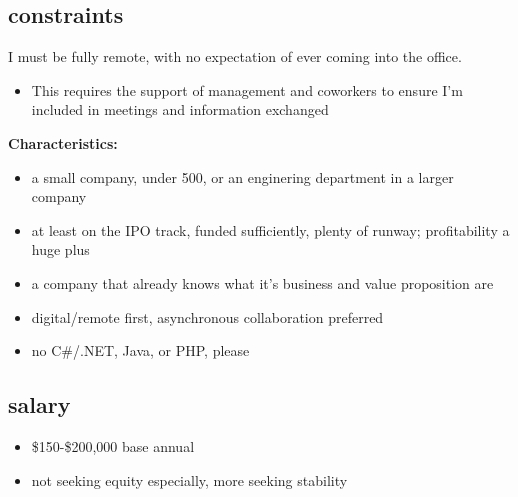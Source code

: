 \documentclass[
]{article}
\providecommand{\tightlist}{%
  \setlength{\itemsep}{0pt}\setlength{\parskip}{0pt}}
\begin{document}
\subsection{constraints}\label{constraints}

I must be fully remote, with no expectation of ever coming into the office.

\begin{itemize}
\tightlist
\item This requires the support of management and coworkers to ensure I'm included in meetings and information exchanged
\end{itemize}

\textbf{Characteristics:}

\begin{itemize}
\tightlist
\item a small company, under 500, or an enginering department in a larger company
\item at least on the IPO track, funded sufficiently, plenty of runway; profitability a huge plus
\item a company that already knows what it's business and value proposition are
\item digital/remote first, asynchronous collaboration preferred
\item no C\#/.NET, Java, or PHP, please
\end{itemize}

\subsection{salary}\label{salary}

\begin{itemize}
\tightlist
\item \$150-\$200,000 base annual
\item not seeking equity especially, more seeking stability
\end{itemize}
\end{document}
